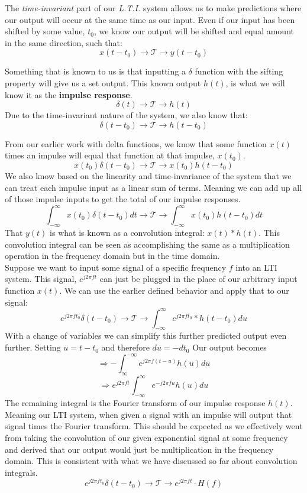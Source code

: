 \documentclass[12pt]{article}
\begin{document}
The \textit{time-invariant} part of our \textit{L.T.I.} system allows us to make predictions where our output will occur at the same time as our input. Even if our input has been shifted by some value, $t_0$, we know our output will be shifted and equal amount in the same direction, such that: 
$$ x(t-t_0) \rightarrow \mathscr{T} \rightarrow y(t-t_0) $$

Something that is known to us is that inputting a $\delta$ function with the sifting property will give us a set output. This known output $h(t)$, is what we will know it as the \textbf{impulse response}. $$ \delta(t) \rightarrow \mathscr{T} \rightarrow h(t) $$ Due to the time-invariant nature of the system, we also know that: $$ \delta(t-t_0) \rightarrow \mathscr{T} \rightarrow h(t-t_0) $$ 


From our earlier work with delta functions, we know that some function $x(t)$ times an impulse will equal that function at that impulse, $x(t_0)$.  $$ x(t_0) \delta (t-t_0) \rightarrow \mathscr{T} \rightarrow x(t_0) h(t-t_0) $$
We also know based on the linearity and time-invariance of the system that we can treat each impulse input as a linear sum of terms. Meaning we can add up all of those impulse inputs to get the total of our impulse responses.
$$ \int_{-\infty}^{\infty} x(t_0) \delta (t-t_0)dt \rightarrow \mathscr{T} \rightarrow \int_{-\infty}^{\infty} x(t_0) h(t-t_0)dt $$
That $y(t)$ is what is known as a convolution integral: $ x(t) * h(t) $. This convolution integral can be seen as accomplishing the same as a multiplication operation in the frequency domain but in the time domain. \\

Suppose we want to  input some signal of a specific frequency $f$ into an LTI system. This signal, $e^{j2\pi ft}$ can just be plugged in the place of our arbitrary input function $x(t)$. We can use the earlier defined behavior and apply that to our signal: $$e^{j2\pi ft_0} \delta (t-t_0) \rightarrow \mathscr{T} \rightarrow  \int_{-\infty}^{\infty} e^{j2\pi f t_0}*h(t-t_0) du $$
With a change of variables we can simplify this further predicted output even further. Setting $ u = t-t_0 $ and therefore $du = -dt_0 $ Our output becomes $$\Rightarrow - \int_{\infty}^{-\infty} e^{j2\pi f(t-u)}h(u)du$$ $$\Rightarrow e^{j2\pi ft} \int_{-\infty}^{\infty} e^{-j2\pi fu} h(u)du$$
The remaining integral is the Fourier transform of our impulse response $h(t)$. Meaning our LTI system, when given a signal with an impulse will output that signal times the Fourier transform. This should be expected as we effectively went from taking the convolution of our given exponential signal at some frequency and derived that our output would just be multiplication in the frequency domain. This is consistent with what we have discussed so far about convolution integrals. $$e^{j2\pi ft_0} \delta (t-t_0) \rightarrow \mathscr{T} \rightarrow  e^{j2\pi ft} \cdot  H(f) $$
\end{document}
